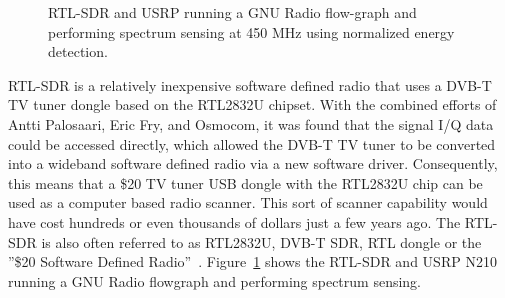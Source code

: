 \begin{figure}[t!]
  \begin{center}
  \hspace{1mm}
   \hspace{1mm}
     \caption{RTL-SDR and USRP running a GNU Radio flow-graph and performing spectrum sensing at 450 MHz using normalized energy detection.} 
\label{usrprtl}      
   \end{center}
\end{figure}

RTL-SDR is a relatively inexpensive software defined radio that uses a DVB-T TV tuner dongle based on the RTL2832U chipset. With the combined efforts of Antti Palosaari, Eric Fry, and Osmocom, it was found that the signal I/Q data could be accessed directly, which allowed the DVB-T TV tuner to be converted into a wideband software defined radio via a new software driver. Consequently, this means that a \$20 TV tuner USB dongle with the RTL2832U chip can be used as a computer based radio scanner. This sort of scanner capability would have cost hundreds or even thousands of dollars just a few years ago. The RTL-SDR is also often referred to as RTL2832U, DVB-T SDR, RTL dongle or the ''\$20 Software Defined Radio''~\cite{rtl}. Figure~\ref{usrprtl} shows the RTL-SDR and USRP N210 running a GNU Radio flowgraph and performing spectrum sensing.

